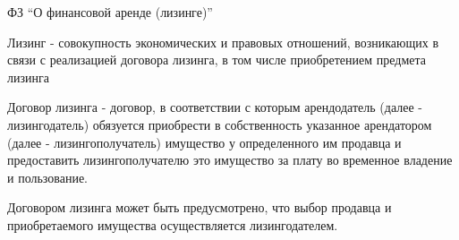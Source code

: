 \documentclass[_Banking_p3.tex]{subfiles}
\begin{document}
\begin{frame}[ allowframebreaks]{ФЗ ``О финансовой аренде (лизинге)''}
\begin{block}{Лизинг}
\quad
- совокупность экономических и правовых отношений, возникающих в связи с реализацией договора лизинга, в том числе приобретением предмета лизинга
\end{block}

\pagebreak
\begin{block}{Договор лизинга }
\quad
- договор, в соответствии с которым арендодатель (далее - лизингодатель) обязуется приобрести в собственность указанное арендатором (далее - лизингополучатель) имущество у определенного им продавца и предоставить лизингополучателю это имущество за плату во временное владение и пользование.
\end{block}

\pagebreak
Договором лизинга может быть предусмотрено, что выбор продавца и приобретаемого имущества осуществляется лизингодателем.
\end{frame}
\end{document}
